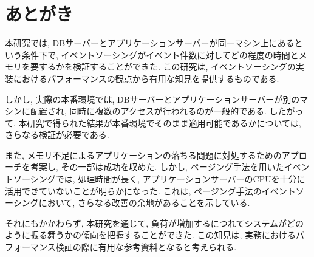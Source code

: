 \documentclass[../../main]{subfiles}
\begin{document}
    \section{あとがき}\label{sec:afterword}

    本研究では, DBサーバーとアプリケーションサーバーが同一マシン上にあるという条件下で, イベントソーシングがイベント件数に対してどの程度の時間とメモリを要するかを検証することができた. この研究は, イベントソーシングの実装におけるパフォーマンスの観点から有用な知見を提供するものである.

    しかし, 実際の本番環境では, DBサーバーとアプリケーションサーバーが別のマシンに配置され, 同時に複数のアクセスが行われるのが一般的である. したがって, 本研究で得られた結果が本番環境でそのまま適用可能であるかについては, さらなる検証が必要である.

    また, メモリ不足によるアプリケーションの落ちる問題に対処するためのアプローチを考案し, その一部は成功を収めた. しかし, ページング手法を用いたイベントソーシングでは, 処理時間が長く, アプリケーションサーバーのCPUを十分に活用できていないことが明らかになった. これは, ページング手法のイベントソーシングにおいて, さらなる改善の余地があることを示している.

    それにもかかわらず, 本研究を通じて, 負荷が増加するにつれてシステムがどのように振る舞うかの傾向を把握することができた. この知見は, 実務におけるパフォーマンス検証の際に有用な参考資料となると考えられる.

    \clearpage
\end{document}

